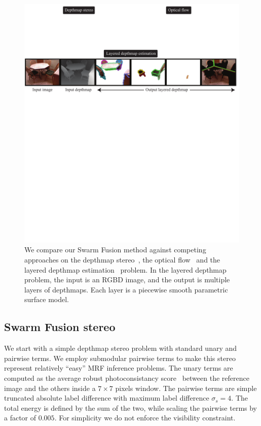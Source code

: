 %
\begin{figure}[tb]
  \includegraphics[width=\columnwidth]{figure/problem.pdf} \caption{We
    compare our Swarm Fusion method against competing approaches on the
    depthmap stereo~\cite{middlebury_stereo}, the optical
    flow~\cite{middlebury_optical_flow} and the layered depthmap
    estimation~\cite{layered_depthmap} problem. In the layered
    depthmap problem, the input is an RGBD image, and the output is
    multiple layers of depthmaps. Each layer is a piecewise smooth
    parametric surface model.}\label{fig:problem}
\end{figure}
%
%
%
\subsection{Swarm Fusion stereo}
We start with a simple depthmap stereo problem with standard unary and
pairwise terms. We employ submodular pairwise terms to make this
stereo represent relatively ``easy'' MRF inference problems.
%
The unary terms are computed as the average robust photoconsistancy
score~\cite{second_order_stereo} between the reference image and the others
inside a $7\times 7$ pixels window. The pairwise terms are simple
truncated absolute label difference with maximum label difference
$\sigma_s=4$. The total energy is defined by the sum of the two, while
scaling the pairwise terms by a factor of $0.005$. For simplicity we
do not enforce the visibility constraint.

